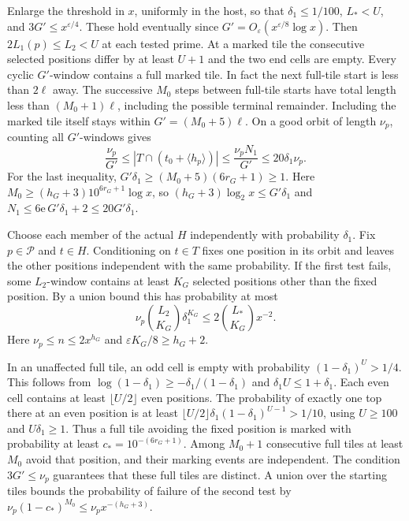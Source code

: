 Enlarge the threshold in \(x\), uniformly in the host, so that
\(\delta_1\le1/100\), \(L_*<U\), and \(3G'\le x^{\varepsilon/4}\).
These hold eventually since \(G'=O_\varepsilon(x^{\varepsilon/8}\log x)\).
Then \(2L_1(p)\le L_2<U\) at each tested prime. At a marked
tile the consecutive selected positions differ by at least \(U+1\)
and the two end cells are empty. Every cyclic \(G'\)-window
contains a full marked tile. In fact the next full-tile start
is less than \(2\ell\) away. The successive \(M_0\) steps between
full-tile starts have total length less than \((M_0+1)\ell\),
including the possible terminal remainder. Including the marked
tile itself stays within \(G'=(M_0+5)\ell\). On a good orbit
of length \(\nu_p\), counting all \(G'\)-windows gives
\[
 \frac{\nu_p}{G'}\le |T\cap(t_0+\langle h_p\rangle)|
    \le \frac{\nu_p N_1}{G'}\le 20\delta_1\nu_p .
\]
For the last inequality, \(G'\delta_1\ge(M_0+5)(6r_G+1)\ge1\).
Here \(M_0\ge(h_G+3)10^{6r_G+1}\log x\), so
\((h_G+3)\log_2 x\le G'\delta_1\) and
\(N_1\le 6\mathrm e\,G'\delta_1+2\le20G'\delta_1\).

Choose each member of the actual \(H\) independently with
probability \(\delta_1\). Fix \(p\in\mathcal P\) and \(t\in H\).
Conditioning on \(t\in T\) fixes one position in its orbit and
leaves the other positions independent with the same probability.
If the first test fails, some \(L_2\)-window contains at least
\(K_G\) selected positions other than the fixed position. By a
union bound this has probability at most
\[
 \nu_p\binom{L_2}{K_G}\delta_1^{K_G}
 \le 2\binom{L_*}{K_G}x^{-2}.
\]
Here \(\nu_p\le n\le2x^{h_G}\) and \(\varepsilon K_G/8\ge h_G+2\).

In an unaffected full tile, an odd cell is empty with probability
\((1-\delta_1)^U>1/4\). This follows from
\(\log(1-\delta_1)\ge-\delta_1/(1-\delta_1)\) and
\(\delta_1 U\le1+\delta_1\). Each even cell contains at least
\(\lfloor U/2\rfloor\) even positions. The probability of exactly
one top there at an even position is at least
\(\lfloor U/2\rfloor\delta_1(1-\delta_1)^{U-1}>1/10\),
using \(U\ge100\) and \(U\delta_1\ge1\). Thus a full tile
avoiding the fixed position is marked with probability at least
\(c_*=10^{-(6r_G+1)}\). Among \(M_0+1\) consecutive full
tiles at least \(M_0\) avoid that position, and their marking
events are independent. The condition \(3G'\le\nu_p\) guarantees
that these full tiles are distinct. A union over the starting
tiles bounds the probability of failure of the second test by
\(\nu_p(1-c_*)^{M_0}\le\nu_p x^{-(h_G+3)}\).

